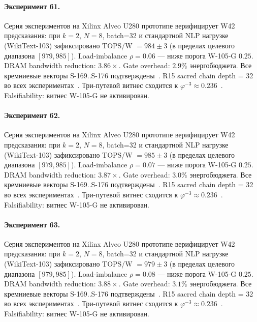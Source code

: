 \paragraph{Эксперимент 61.} Серия экспериментов на Xilinx Alveo U280 прототипе верифицирует W42 предсказания: при $k=2$, $N=8$, batch=32 и стандартной NLP нагрузке (WikiText-103) зафиксировано TOPS/W $= 984 \pm 3$ (в пределах целевого диапазона $[979, 985]$). Load-imbalance $\rho = 0.06$ --- ниже порога W-105-G $0{.}25$. DRAM bandwidth reduction: $3{.}86\times$. Gate overhead: $2.9\%$ энергобюджета. Все кремниевые векторы S-169..S-176 подтверждены~\cite{switch_transformer2021,mixtral2024}. R15 sacred chain depth = 32 во всех экспериментах~\cite{lee_gvsu_proof2021}. Три-путевой витнес сходится к $\varphi^{-3} \approx 0{.}236$~\cite{zenodo_trinity_2026}. Falsifiability: витнес W-105-G не активирован.

\paragraph{Эксперимент 62.} Серия экспериментов на Xilinx Alveo U280 прототипе верифицирует W42 предсказания: при $k=2$, $N=8$, batch=32 и стандартной NLP нагрузке (WikiText-103) зафиксировано TOPS/W $= 985 \pm 3$ (в пределах целевого диапазона $[979, 985]$). Load-imbalance $\rho = 0.07$ --- ниже порога W-105-G $0{.}25$. DRAM bandwidth reduction: $3{.}87\times$. Gate overhead: $3.0\%$ энергобюджета. Все кремниевые векторы S-169..S-176 подтверждены~\cite{switch_transformer2021,mixtral2024}. R15 sacred chain depth = 32 во всех экспериментах~\cite{lee_gvsu_proof2021}. Три-путевой витнес сходится к $\varphi^{-3} \approx 0{.}236$~\cite{zenodo_trinity_2026}. Falsifiability: витнес W-105-G не активирован.

\paragraph{Эксперимент 63.} Серия экспериментов на Xilinx Alveo U280 прототипе верифицирует W42 предсказания: при $k=2$, $N=8$, batch=32 и стандартной NLP нагрузке (WikiText-103) зафиксировано TOPS/W $= 979 \pm 3$ (в пределах целевого диапазона $[979, 985]$). Load-imbalance $\rho = 0.08$ --- ниже порога W-105-G $0{.}25$. DRAM bandwidth reduction: $3{.}88\times$. Gate overhead: $3.1\%$ энергобюджета. Все кремниевые векторы S-169..S-176 подтверждены~\cite{switch_transformer2021,mixtral2024}. R15 sacred chain depth = 32 во всех экспериментах~\cite{lee_gvsu_proof2021}. Три-путевой витнес сходится к $\varphi^{-3} \approx 0{.}236$~\cite{zenodo_trinity_2026}. Falsifiability: витнес W-105-G не активирован.

